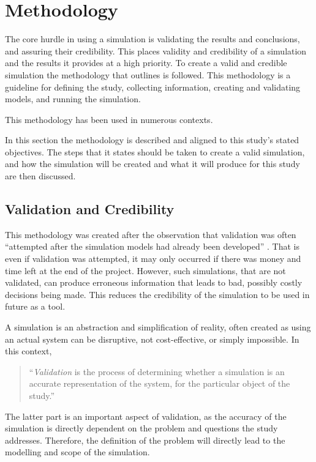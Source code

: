 \section{Methodology}
{}The core hurdle in using a simulation is validating the results and conclusions, and assuring their credibility.
{}This places validity and credibility of a simulation and the results it provides at a high priority.
{}To create a valid and credible simulation the methodology that \citep{Law2005} outlines is followed.
{}This methodology is a guideline for defining the study, collecting information, creating and validating models, and running the simulation.

This methodology has been used in numerous contexts. %

{}In this section the methodology is described and aligned to this study's stated objectives. 
{}The steps that it states should be taken to create a valid simulation, and how the simulation will be created and what it will produce for this study are then discussed.

\subsection{Validation and Credibility}
This methodology was created after the observation that validation was often ``attempted after the simulation models had already been developed'' \citep{Law2005}.
That is even if validation was attempted, it may only occurred if there was money and time left at the end of the project.
However, such simulations, that are not validated, can produce erroneous information that leads to bad, possibly costly decisions being made.
This reduces the credibility of the simulation to be used in future as a tool.

A simulation is an abstraction and simplification of reality, often created as using an actual system can be disruptive, not cost-effective, or simply impossible.
In this context,

\begin{quotation}
``\textit{Validation} is the process of determining whether a simulation is an accurate representation of the system, for the particular object of the study.'' \citep{Law2005}
\end{quotation}

The latter part is an important aspect of validation, as the accuracy of the simulation is directly dependent on the problem and questions the study addresses.
Therefore, the definition of the problem will directly lead to the modelling and scope of the simulation.


